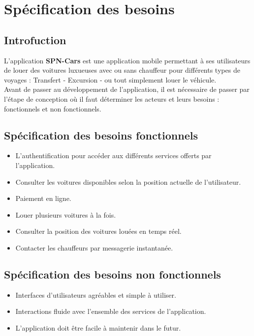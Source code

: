 \chapter{Spécification des besoins}
\minitoc
\clearpage
\section*{Introfuction}
L'application \textbf{SPN-Cars} est une application mobile permettant à ses utilisateurs de louer des voitures luxueuses avec ou sans chauffeur pour différents types de voyages : Transfert - Excursion - ou tout simplement louer le véhicule.\\
\noindent Avant de passer au développement de l'application, il est nécessaire de passer par l'étape de conception où il faut déterminer les acteurs et leurs besoins : fonctionnels et non fonctionnels.
\section{Spécification des besoins fonctionnels}
\begin{itemize}
    \item L'authentification pour accéder aux différents services offerts par l'application.
    \item Consulter les voitures disponibles selon la position actuelle de l'utilisateur.
    \item Paiement en ligne.
    \item Louer plusieurs voitures à la fois.
    \item Consulter la position des voitures louées en temps réel.
    \item Contacter les chauffeurs par messagerie instantanée.
\end{itemize}
\section{Spécification des besoins non fonctionnels}
\begin{itemize}
    \item Interfaces d'utilisateurs agréables et simple à utiliser.
    \item Interactions fluide avec l'ensemble des services de l'application.
    \item L'application doit être facile à maintenir dans le futur.
\end{itemize}
